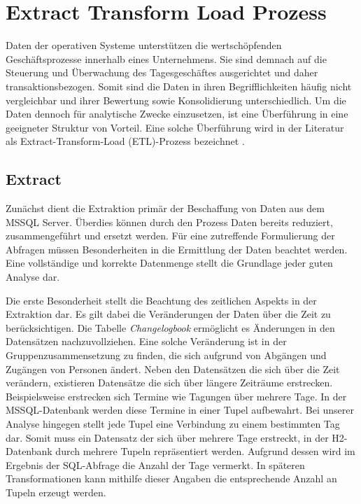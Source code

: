 \section{Extract Transform Load Prozess}

Daten der operativen Systeme unterstützen die wertschöpfenden Geschäftsprozesse innerhalb eines Unternehmens. Sie sind demnach auf die Steuerung und Überwachung des Tagesgeschäftes ausgerichtet und daher transaktionsbezogen. Somit sind die Daten in ihren Begrifflichkeiten häufig nicht vergleichbar und ihrer Bewertung sowie Konsolidierung unterschiedlich. Um die Daten dennoch für analytische Zwecke einzusetzen, ist eine Überführung in eine geeigneter Struktur von Vorteil. Eine solche Überführung wird in der Literatur als Extract-Transform-Load (ETL)-Prozess bezeichnet \cite{ElSappagh201191}. 

\subsection{Extract}

Zunächst dient die Extraktion primär der Beschaffung von Daten aus dem MSSQL Server. Überdies können durch den Prozess Daten bereits reduziert,  zusammengeführt und ersetzt werden. Für eine zutreffende Formulierung der Abfragen müssen Besonderheiten in die Ermittlung der Daten beachtet werden. Eine vollständige und korrekte Datenmenge stellt die Grundlage jeder guten Analyse dar.

Die erste Besonderheit stellt die Beachtung des zeitlichen Aspekts in der Extraktion dar. Es gilt dabei die Veränderungen der Daten über die Zeit zu berücksichtigen. Die Tabelle  \textit{Changelogbook} ermöglicht es Änderungen in den Datensätzen nachzuvollziehen. Eine solche Veränderung ist in der Gruppenzusammensetzung zu finden, die sich aufgrund von Abgängen und Zugängen von Personen ändert. Neben den Datensätzen die sich über die Zeit verändern, existieren Datensätze die sich über längere Zeiträume erstrecken. Beispielsweise erstrecken sich Termine wie Tagungen  über mehrere Tage. In der MSSQL-Datenbank werden diese Termine in einer Tupel aufbewahrt. Bei unserer Analyse hingegen stellt jede Tupel eine Verbindung zu einem bestimmten Tag dar. Somit muss ein Datensatz der sich über mehrere Tage erstreckt, in der H2-Datenbank durch mehrere Tupeln repräsentiert werden. Aufgrund dessen wird im Ergebnis der SQL-Abfrage die Anzahl der Tage vermerkt. In späteren Transformationen kann mithilfe dieser Angaben die entsprechende Anzahl an Tupeln erzeugt werden.

